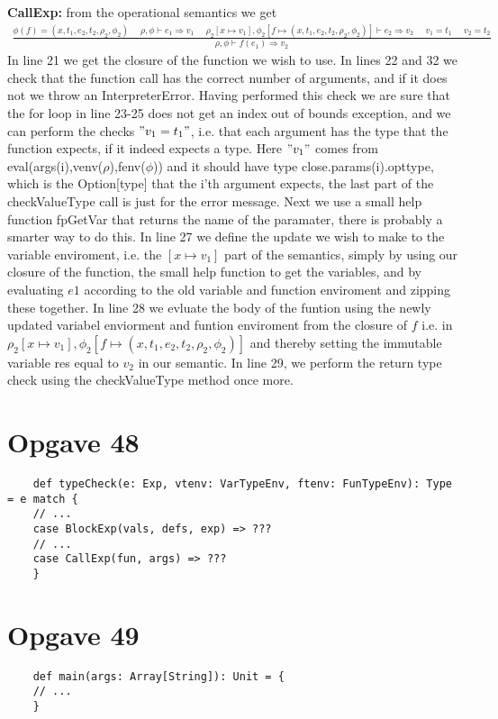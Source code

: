 \documentclass[a4paper, 10pt]{article}
\theoremstyle{remark}
\begin{document}
	\noindent\textbf{CallExp:} from the operational semantics we get\\
	\begin{align*}
	\frac{\phi(f) = (x,t_1,e_2,t_2,\rho_2,\phi_2) \text{ }\text{ }\rho,\phi\vdash e_1\Rightarrow v_1\text{ }\text{ }\rho_2[x\mapsto v_1],\phi_2[f\mapsto(x,t_1,e_2,t_2,\rho_2,\phi_2)]\vdash e_2 \Rightarrow v_2 \text{ }\text{ }v_1=t_1 \text{ }\text{ }v_2=t_2}{\rho,\phi\vdash f(e_1) \Rightarrow v_2}
	\end{align*}
	In line 21 we get the closure of the function we wish to use. In lines 22 and 32 we check that the function call has the correct number of arguments, and if it does not we throw an InterpreterError. Having performed this check we are sure that the for loop in line 23-25 does not get an index out of bounds exception, and we can perform the checks $"v_1 = t_1"$, i.e. that each argument has the type that the function expects, if it indeed expects a type. Here $"v_1"$ comes from eval(args(i),venv($\rho$),fenv($\phi$)) and it should have type close.params(i).opttype, which is the Option[type] that the i'th argument expects, the last part of the checkValueType call is just for the error message. Next we use a small help function fpGetVar that returns the name of the paramater, there is probably a smarter way to do this. In line 27 we define the update we wish to make to the variable enviroment, i.e. the $[x\mapsto v_1]$ part of the semantics, simply by using our closure of the function, the small help function to get the variables, and by evaluating $e1$ according to the old variable and function enviroment and zipping these together. In line 28 we evluate the body of the funtion using the newly updated variabel enviorment and funtion enviroment from the closure of $f$ i.e. in $\rho_2[x\mapsto v_1],\phi_2[f\mapsto(x,t_1,e_2,t_2,\rho_2,\phi_2)]$ and thereby setting the immutable variable res equal to $v_2$ in our semantic. In line 29, we perform the return type check using the checkValueType method once more.
	\section*{Opgave 48}
	\begin{lstlisting}
	def typeCheck(e: Exp, vtenv: VarTypeEnv, ftenv: FunTypeEnv): Type = e match {
	// ...
	case BlockExp(vals, defs, exp) => ???
	// ...
	case CallExp(fun, args) => ???
	}
	\end{lstlisting}
	\section*{Opgave 49}
	\begin{lstlisting}
	def main(args: Array[String]): Unit = {
	// ...
	}
	\end{lstlisting}
\end{document}
